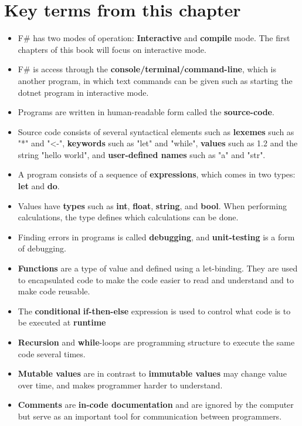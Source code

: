 \documentclass[springer.tex]{subfiles}
\begin{document}
\section{Key terms from this chapter}
\begin{itemize}
\item F\# has two modes of operation: \textbf{Interactive} and \textbf{compile} mode. The first chapters of this book will focus on interactive mode. 
\item F\# is access through the \textbf{console/terminal/command-line}, which is another program, in which text commands can be given such as starting the dotnet program in interactive mode.
\item Programs are written in human-readable form called the \textbf{source-code}.
\item Source code consists of several syntactical elements such as \textbf{lexemes} such as "*" and "<-", \textbf{keywords} such as "let" and "while", \textbf{values} such as 1.2 and the string "hello world", and \textbf{user-defined names} such as "a" and "str".
\item A program consists of a sequence of \textbf{expressions}, which comes in two types: \textbf{let} and \textbf{do}.
\item Values have \textbf{types} such as \textbf{int}, \textbf{float}, \textbf{string}, and \textbf{bool}. When performing calculations, the type defines which calculations can be done.
\item Finding errors in programs is called \textbf{debugging}, and \textbf{unit-testing} is a form of debugging. 
\item \textbf{Functions} are a type of value and defined using a let-binding. They are used to encapsulated code to make the code easier to read and understand and to make code reusable.
\item The \textbf{conditional} \textbf{if-then-else} expression is used to control what code is to be executed at \textbf{runtime}
\item \textbf{Recursion} and \textbf{while}-loops are programming structure to execute the same code several times.
\item \textbf{Mutable values} are in contrast to \textbf{immutable values} may change value over time, and makes programmer harder to understand.
\item \textbf{Comments} are \textbf{in-code documentation} and are ignored by the computer but serve as an important tool for communication between programmers.
\end{itemize}
\end{document}
